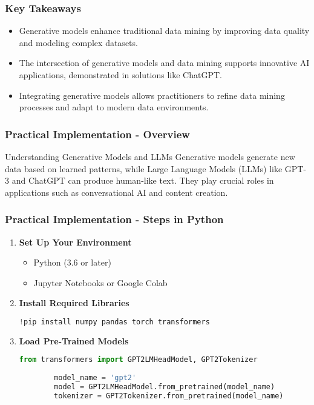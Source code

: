 \documentclass[aspectratio=169]{beamer}
\begin{document}
\begin{frame}[fragile]
    \frametitle{Key Takeaways}
    \begin{itemize}
        \item Generative models enhance traditional data mining by improving data quality and modeling complex datasets.
        \item The intersection of generative models and data mining supports innovative AI applications, demonstrated in solutions like ChatGPT.
        \item Integrating generative models allows practitioners to refine data mining processes and adapt to modern data environments.
    \end{itemize}
\end{frame}

\begin{frame}[fragile]
    \frametitle{Practical Implementation - Overview}
    \begin{block}{Understanding Generative Models and LLMs}
        Generative models generate new data based on learned patterns, while Large Language Models (LLMs) like GPT-3 and ChatGPT can produce human-like text. They play crucial roles in applications such as conversational AI and content creation.
    \end{block}
\end{frame}

\begin{frame}[fragile]
    \frametitle{Practical Implementation - Steps in Python}
    \begin{enumerate}
        \item \textbf{Set Up Your Environment}
        \begin{itemize}
            \item Python (3.6 or later)
            \item Jupyter Notebooks or Google Colab
        \end{itemize}

        \item \textbf{Install Required Libraries}
        \begin{lstlisting}[language=Python]
        !pip install numpy pandas torch transformers
        \end{lstlisting}
        
        \item \textbf{Load Pre-Trained Models}
        \begin{lstlisting}[language=Python]
        from transformers import GPT2LMHeadModel, GPT2Tokenizer
        
        model_name = 'gpt2'
        model = GPT2LMHeadModel.from_pretrained(model_name)
        tokenizer = GPT2Tokenizer.from_pretrained(model_name)
        \end{lstlisting}
    \end{enumerate}
\end{frame}
\end{document}
